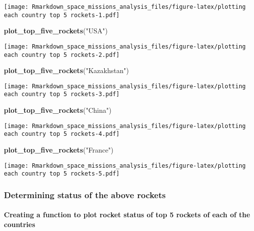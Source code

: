 \documentclass[
]{article}
\newenvironment{Shaded}{\begin{snugshade}}{\end{snugshade}}
\newcommand{\FunctionTok}[1]{\textcolor[rgb]{0.13,0.29,0.53}{\textbf{#1}}}
\newcommand{\NormalTok}[1]{#1}
\newcommand{\StringTok}[1]{\textcolor[rgb]{0.31,0.60,0.02}{#1}}
\begin{document}
\texttt{[image: Rmarkdown\_space\_missions\_analysis\_files/figure-latex/plotting each country top 5 rockets-1.pdf]}

\begin{Shaded}
\begin{Highlighting}[]
\FunctionTok{plot\_top\_five\_rockets}\NormalTok{(}\StringTok{"USA"}\NormalTok{)}
\end{Highlighting}
\end{Shaded}

\texttt{[image: Rmarkdown\_space\_missions\_analysis\_files/figure-latex/plotting each country top 5 rockets-2.pdf]}

\begin{Shaded}
\begin{Highlighting}[]
\FunctionTok{plot\_top\_five\_rockets}\NormalTok{(}\StringTok{"Kazakhstan"}\NormalTok{)}
\end{Highlighting}
\end{Shaded}

\texttt{[image: Rmarkdown\_space\_missions\_analysis\_files/figure-latex/plotting each country top 5 rockets-3.pdf]}

\begin{Shaded}
\begin{Highlighting}[]
\FunctionTok{plot\_top\_five\_rockets}\NormalTok{(}\StringTok{"China"}\NormalTok{)}
\end{Highlighting}
\end{Shaded}

\texttt{[image: Rmarkdown\_space\_missions\_analysis\_files/figure-latex/plotting each country top 5 rockets-4.pdf]}

\begin{Shaded}
\begin{Highlighting}[]
\FunctionTok{plot\_top\_five\_rockets}\NormalTok{(}\StringTok{"France"}\NormalTok{)}
\end{Highlighting}
\end{Shaded}

\texttt{[image: Rmarkdown\_space\_missions\_analysis\_files/figure-latex/plotting each country top 5 rockets-5.pdf]}

\hypertarget{determining-status-of-the-above-rockets}{%
\subsubsection{Determining status of the above
rockets}\label{determining-status-of-the-above-rockets}}

\hypertarget{creating-a-function-to-plot-rocket-status-of-top-5-rockets-of-each-of-the-countries}{%
\paragraph{Creating a function to plot rocket status of top 5 rockets of
each of the
countries}\label{creating-a-function-to-plot-rocket-status-of-top-5-rockets-of-each-of-the-countries}}
\end{document}
